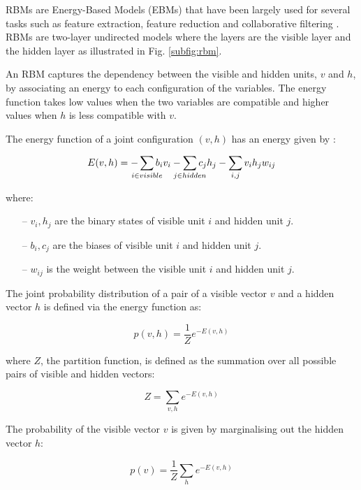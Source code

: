 \documentclass[runningheads]{llncs}
\begin{document}
\acp{RBM} are Energy-Based Models (EBMs) that have been largely used for several tasks such as feature extraction, feature reduction and collaborative filtering \cite{Hinton,Salakhutdinov}. \acp{RBM} are two-layer undirected models where the layers are the visible layer and the hidden layer as illustrated in Fig. \ref{subfig:rbm}.



An \ac{RBM} captures the dependency between the visible and hidden units, $v$ and $h$, by associating an energy to each configuration of the variables. The energy function takes low values when the two variables are compatible and higher values when $h$ is less compatible with $v$.

The energy function of a joint configuration $(v, h)$ has an energy given by \cite{Geoffrey}:


\begin{equation}
E(v,h) = - \smashoperator{\sum_{i\in{visible}}} b_{i}v_{i} - \smashoperator{\sum_{j\in{hidden}}} c_{j}h_{j} - \smashoperator{\sum_{i,j}} v_{i}h_{j}w_{ij}
\end{equation}

where:
\begin{itemize}
     \item[--] $v_{i},h_{j}$ are the binary states of visible unit $i$ and hidden unit $j$.
     \item[--] $b_{i},c_{j}$ are the biases of visible unit $i$ and hidden unit $j$.
     \item[--] $w_{ij}$ is the weight between the visible unit $i$ and hidden unit $j$.
 \end{itemize}

The joint probability distribution of a pair of a visible vector $v$ and a hidden vector $h$ is defined via the energy function as:


\begin{equation}
p(v,h)=\frac{1}{Z}e^{-E(v,h)}
\end{equation}

where $Z$, the partition function, is defined as the summation over all possible pairs of visible and hidden vectors:

\begin{equation}
Z=\sum_{v, h}{e^{-E(v,h)}}
\end{equation}

The probability of the visible vector $v$ is given by marginalising out the hidden vector $h$:

\begin{equation}
p(v)=\frac{1}{Z}\sum_{h}{e^{-E(v,h)}}
\end{equation}
\end{document}
